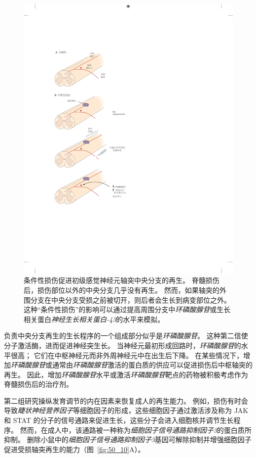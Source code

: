 \begin{figure}[htbp]
	\centering
	\includegraphics[width=0.65\linewidth]{chap50/fig_50_9}
	\caption{条件性损伤促进初级感觉神经元轴突中央分支的再生。
		脊髓损伤后，损伤部位以外的中央分支几乎没有再生。
		然而，如果轴突的外围分支在中央分支受损之前被切开，则后者会生长到病变部位之外。
		这种“条件性损伤”的影响可以通过提高周围分支中\textit{环磷酸腺苷}或生长相关蛋白\textit{神经生长相关蛋白-43}的水平来模拟。}
	\label{fig:50_9}
\end{figure}


负责中央分支再生的生长程序的一个组成部分似乎是\textit{环磷酸腺苷}。
这种第二信使分子激活酶，进而促进神经突生长。
当神经元最初形成回路时，\textit{环磷酸腺苷}的水平很高；
它们在中枢神经元而非外周神经元中在出生后下降。
在某些情况下，增加\textit{环磷酸腺苷}或通常由\textit{环磷酸腺苷}激活的蛋白质的供应可以促进损伤后中枢轴突的再生。
因此，增加\textit{环磷酸腺苷}水平或激活\textit{环磷酸腺苷}靶点的药物被积极考虑作为脊髓损伤后的治疗剂。


第二组研究操纵发育调节的内在因素来恢复成人的再生能力。
例如，损伤有时会导致\textit{睫状神经营养因子}等细胞因子的形成，这些细胞因子通过激活涉及称为 JAK 和 STAT 的分子的信号通路来促进生长，这些分子会进入细胞核并调节生长程序。
然而，在成人中，该通路被一种称为\textit{细胞因子信号通路抑制因子3}的蛋白质所抑制。
删除小鼠中的\textit{细胞因子信号通路抑制因子3}基因可解除抑制并增强细胞因子促进受损轴突再生的能力（图~\ref{fig:50_10}A）。


